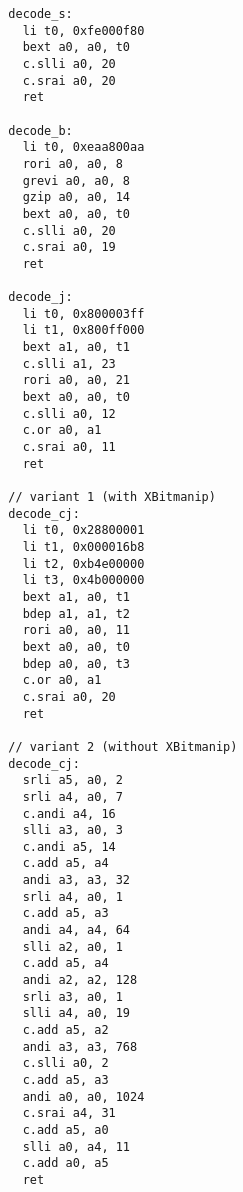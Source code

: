 \begin{multicols}{2}
\begin{verbatim}
  decode_s:
    li t0, 0xfe000f80
    bext a0, a0, t0
    c.slli a0, 20
    c.srai a0, 20
    ret

  decode_b:
    li t0, 0xeaa800aa
    rori a0, a0, 8
    grevi a0, a0, 8
    gzip a0, a0, 14
    bext a0, a0, t0
    c.slli a0, 20
    c.srai a0, 19
    ret

  decode_j:
    li t0, 0x800003ff
    li t1, 0x800ff000
    bext a1, a0, t1
    c.slli a1, 23
    rori a0, a0, 21
    bext a0, a0, t0
    c.slli a0, 12
    c.or a0, a1
    c.srai a0, 11
    ret

  // variant 1 (with XBitmanip)
  decode_cj:
    li t0, 0x28800001
    li t1, 0x000016b8
    li t2, 0xb4e00000
    li t3, 0x4b000000
    bext a1, a0, t1
    bdep a1, a1, t2
    rori a0, a0, 11
    bext a0, a0, t0
    bdep a0, a0, t3
    c.or a0, a1
    c.srai a0, 20
    ret

  // variant 2 (without XBitmanip)
  decode_cj:
    srli a5, a0, 2
    srli a4, a0, 7
    c.andi a4, 16
    slli a3, a0, 3
    c.andi a5, 14
    c.add a5, a4
    andi a3, a3, 32
    srli a4, a0, 1
    c.add a5, a3
    andi a4, a4, 64
    slli a2, a0, 1
    c.add a5, a4
    andi a2, a2, 128
    srli a3, a0, 1
    slli a4, a0, 19
    c.add a5, a2
    andi a3, a3, 768
    c.slli a0, 2
    c.add a5, a3
    andi a0, a0, 1024
    c.srai a4, 31
    c.add a5, a0
    slli a0, a4, 11
    c.add a0, a5
    ret
\end{verbatim}
\end{multicols}
